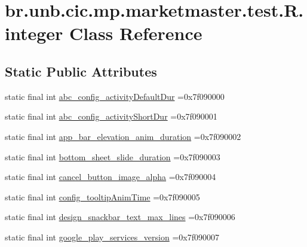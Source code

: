 \hypertarget{classbr_1_1unb_1_1cic_1_1mp_1_1marketmaster_1_1test_1_1R_1_1integer}{}\section{br.\+unb.\+cic.\+mp.\+marketmaster.\+test.\+R.\+integer Class Reference}
\label{classbr_1_1unb_1_1cic_1_1mp_1_1marketmaster_1_1test_1_1R_1_1integer}
\subsection*{Static Public Attributes}
\begin{DoxyCompactItemize}
\item 
static final int \mbox{\hyperlink{classbr_1_1unb_1_1cic_1_1mp_1_1marketmaster_1_1test_1_1R_1_1integer_a4726cf23b789aa8f74a7e2fdf799a0c5}{abc\+\_\+config\+\_\+activity\+Default\+Dur}} =0x7f090000
\item 
static final int \mbox{\hyperlink{classbr_1_1unb_1_1cic_1_1mp_1_1marketmaster_1_1test_1_1R_1_1integer_abdab61e1ae9715bb63e446beca20271b}{abc\+\_\+config\+\_\+activity\+Short\+Dur}} =0x7f090001
\item 
static final int \mbox{\hyperlink{classbr_1_1unb_1_1cic_1_1mp_1_1marketmaster_1_1test_1_1R_1_1integer_adfcf3c752d97eb013b68a737c62a0f7c}{app\+\_\+bar\+\_\+elevation\+\_\+anim\+\_\+duration}} =0x7f090002
\item 
static final int \mbox{\hyperlink{classbr_1_1unb_1_1cic_1_1mp_1_1marketmaster_1_1test_1_1R_1_1integer_a36cf93df61d08ec25916d46917db2d75}{bottom\+\_\+sheet\+\_\+slide\+\_\+duration}} =0x7f090003
\item 
static final int \mbox{\hyperlink{classbr_1_1unb_1_1cic_1_1mp_1_1marketmaster_1_1test_1_1R_1_1integer_ad6a4c2c844896de17f28773ff7a9a92b}{cancel\+\_\+button\+\_\+image\+\_\+alpha}} =0x7f090004
\item 
static final int \mbox{\hyperlink{classbr_1_1unb_1_1cic_1_1mp_1_1marketmaster_1_1test_1_1R_1_1integer_a726db07a08439084bee44fc87752b056}{config\+\_\+tooltip\+Anim\+Time}} =0x7f090005
\item 
static final int \mbox{\hyperlink{classbr_1_1unb_1_1cic_1_1mp_1_1marketmaster_1_1test_1_1R_1_1integer_a73a521552eaf60bebc94b81280ad73c6}{design\+\_\+snackbar\+\_\+text\+\_\+max\+\_\+lines}} =0x7f090006
\item 
static final int \mbox{\hyperlink{classbr_1_1unb_1_1cic_1_1mp_1_1marketmaster_1_1test_1_1R_1_1integer_aa3691f2246d94626d4b01225cc2d77e6}{google\+\_\+play\+\_\+services\+\_\+version}} =0x7f090007

\end{DoxyCompactItemize}

